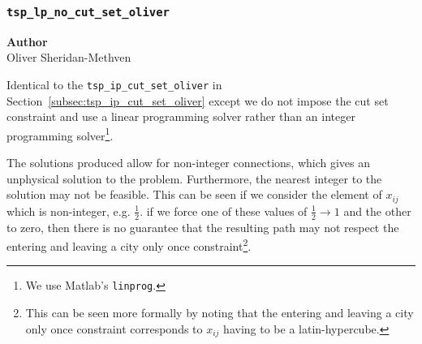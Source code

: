 \subsubsection{\texttt{tsp\_lp\_no\_cut\_set\_oliver}}
\label{subsubsec:tsp_lp_no_cut_set_oliver}

\begin{flushright}
\textbf{Author} \\
Oliver Sheridan-Methven
\end{flushright}

Identical to the \verb|tsp_ip_cut_set_oliver| in Section~\ref{subsec:tsp_ip_cut_set_oliver} except we do not impose the cut set constraint and use a linear programming solver rather than an integer programming solver\footnote{We use Matlab's \texttt{linprog}.}. 

The solutions produced allow for non-integer connections, which gives an unphysical solution to the problem. Furthermore, the nearest integer to the solution may not be feasible. This can be seen if we consider the element of $ x_{ij} $ which is non-integer, e.g. $ \frac{1}{2} $. if we force one of these values of $ \frac{1}{2} \to 1$ and the other to zero, then there is no guarantee that the resulting path may not respect the entering and leaving a city only once constraint\footnote{This can be seen more formally by noting that the entering and leaving a city only once constraint corresponds to $ x_{ij} $ having to be a latin-hypercube.}.